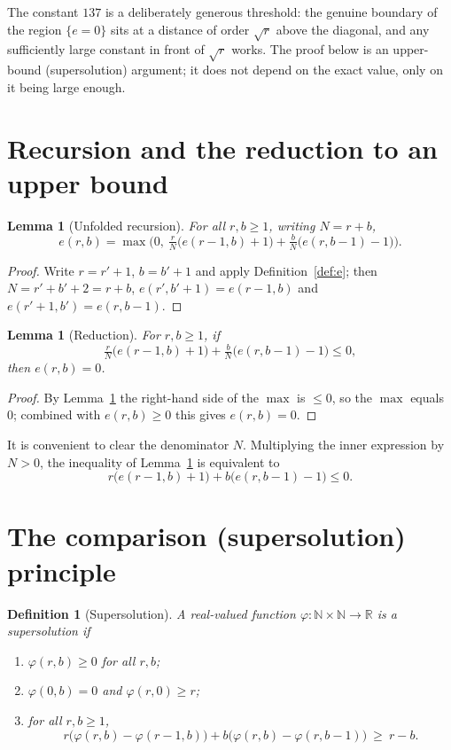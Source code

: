 \documentclass{article}
\newtheorem{lemma}[theorem]{Lemma}
\newtheorem{definition}[theorem]{Definition}
\begin{document}
The constant $137$ is a deliberately generous threshold: the genuine boundary of
the region $\{e=0\}$ sits at a distance of order $\sqrt r$ above the diagonal, and
any sufficiently large constant in front of $\sqrt r$ works. The proof below is an
upper-bound (supersolution) argument; it does not depend on the exact value, only
on it being large enough.

\section{Recursion and the reduction to an upper bound}

\begin{lemma}[Unfolded recursion]\label{lem:recursion}
\leanok
{}
For all $r,b\ge 1$, writing $N=r+b$,
\[
  e(r,b)=\max\!\Big(0,\ \tfrac{r}{N}\big(e(r-1,b)+1\big)
                       +\tfrac{b}{N}\big(e(r,b-1)-1\big)\Big).
\]
\end{lemma}
\begin{proof}\leanok
Write $r=r'+1$, $b=b'+1$ and apply Definition~\ref{def:e}; then $N=r'+b'+2=r+b$,
$e(r',b'+1)=e(r-1,b)$ and $e(r'+1,b')=e(r,b-1)$.
\end{proof}

\begin{lemma}[Reduction]\label{lem:reduction}
\leanok
{}
For $r,b\ge 1$, if
\[
  \tfrac{r}{N}\big(e(r-1,b)+1\big)+\tfrac{b}{N}\big(e(r,b-1)-1\big)\le 0,
\]
then $e(r,b)=0$.
\end{lemma}
\begin{proof}\leanok
By Lemma~\ref{lem:recursion} the right-hand side of the $\max$ is $\le 0$, so the
$\max$ equals $0$; combined with $e(r,b)\ge 0$ this gives $e(r,b)=0$.
\end{proof}

It is convenient to clear the denominator $N$. Multiplying the inner expression by
$N>0$, the inequality of Lemma~\ref{lem:reduction} is equivalent to
\[
  r\big(e(r-1,b)+1\big)+b\big(e(r,b-1)-1\big)\le 0 .
\]

\section{The comparison (supersolution) principle}

\begin{definition}[Supersolution]\label{def:super}
\leanok
{}
A real-valued function $\varphi:\mathbb N\times\mathbb N\to\mathbb R$ is a
\emph{supersolution} if
\begin{enumerate}
  \item $\varphi(r,b)\ge 0$ for all $r,b$;
  \item $\varphi(0,b)=0$ and $\varphi(r,0)\ge r$;
  \item for all $r,b\ge1$,
  \[
    r\big(\varphi(r,b)-\varphi(r-1,b)\big)
    +b\big(\varphi(r,b)-\varphi(r,b-1)\big)\ \ge\ r-b. \tag{SS}
  \]
\end{enumerate}
\end{definition}
\end{document}
